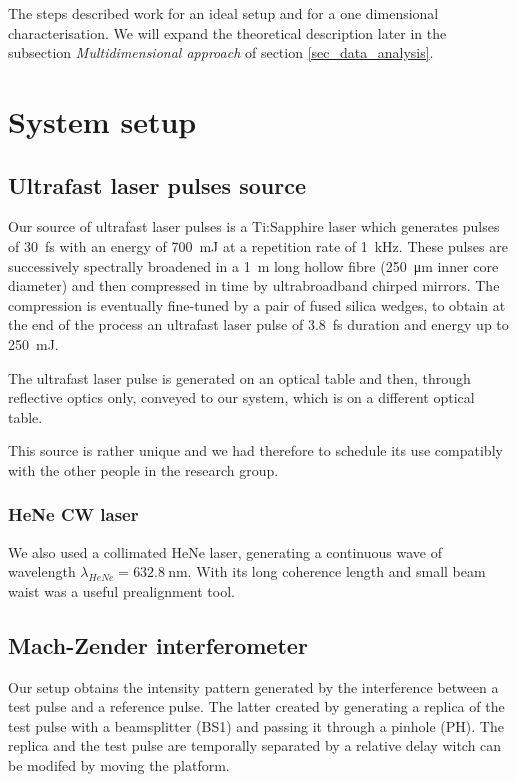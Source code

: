 \documentclass[12pt,a4paper,twoside]{article}
\begin{document}
The steps described work for an ideal setup and for a one dimensional characterisation.
We will expand the theoretical description later in the subsection \textit{Multidimensional approach} of section \ref{sec_data_analysis}.

\clearpage
\section{System setup}
\subsection{Ultrafast laser pulses source}
Our source of ultrafast laser pulses is a Ti:Sapphire laser which generates pulses of \SI{30}{\fs} with an energy of \SI{700}{\milli\J} at a repetition rate of \SI{1}{\kHz}.
These pulses are successively spectrally broadened in a \SI{1}{\m} long hollow fibre (\SI{250}{\um} inner core diameter) and then compressed in time by ultrabroadband chirped mirrors.
The compression is eventually fine-tuned by a pair of fused silica wedges, to obtain at the end of the process an ultrafast laser pulse of \SI{3.8}{\fs} duration and energy up to \SI{250}{\milli\J}.

The ultrafast laser pulse is generated on an optical table and then, through reflective optics only, conveyed to our system, which is on a different optical table.

This source is rather unique and we had therefore to schedule its use compatibly with the other people in the research group.

\subsubsection*{HeNe CW laser}
We also used a collimated HeNe laser, generating a continuous wave of wavelength $\lambda_{HeNe}=\SI{632.8}{\nm}$.
With its long coherence length and small beam waist was a useful prealignment tool.

\subsection{Mach-Zender interferometer}
Our setup obtains the intensity pattern generated by the interference between a test pulse and a reference pulse.
The latter created by generating a replica of the test pulse with a beamsplitter (BS1) and passing it through a pinhole (PH).
The replica and the test pulse are temporally separated by a relative delay witch can be modifed by moving the platform.
\end{document}
